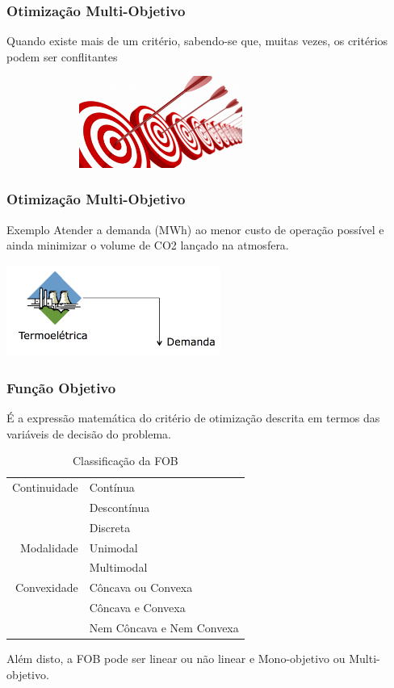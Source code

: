\documentclass{beamer}
\begin{document}
\begin{frame}
	\frametitle{Otimização Multi-Objetivo}
	Quando existe \alert{mais de um critério}, sabendo-se que, muitas vezes, os critérios podem ser \alert{conflitantes}
	\begin{figure}
		\includegraphics[width=8cm,height=3cm]{multiobjetivo.png}
	\end{figure}
\end{frame}

\begin{frame}
	\frametitle{Otimização Multi-Objetivo}
	\centering
	\begin{exampleblock}{Exemplo}
		Atender a demanda (MWh) ao menor custo de operação possível e ainda minimizar o volume de CO2 lançado na atmosfera.
	\end{exampleblock}
	\includegraphics[width=7cm,height=3cm]{CO2.png}
\end{frame}

\begin{frame}
	\frametitle{Função Objetivo}
	É a \alert{expressão matemática do critério de otimização} descrita em termos das \alert{variáveis de decisão} do problema.
	\begin{table}
		\caption{Classificação da FOB}
		\begin{tabular}{r l}
			\hline
			\hline
			\alert{Continuidade} & Contínua   \\
								 & Descontínua \\
								 & Discreta    \\
			\hline
			\alert{Modalidade}   & Unimodal   \\
							     & Multimodal \\
			\hline
			\alert{Convexidade}  & Côncava ou Convexa \\
							     & Côncava e Convexa \\
							     & Nem Côncava e Nem Convexa \\
			\hline
		\end{tabular}
	\end{table}
	Além disto, a FOB pode ser \alert{linear ou não linear} e \alert{Mono-objetivo ou Multi-objetivo}.
                                                \end{frame}
\end{document}
